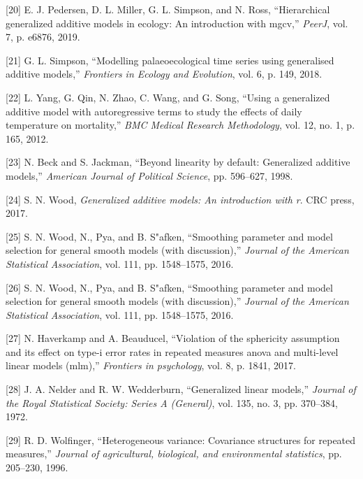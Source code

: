 \documentclass[
]{article}
\begin{document}
\leavevmode\hypertarget{ref-pedersen2019}{}%
{[}20{]} E. J. Pedersen, D. L. Miller, G. L. Simpson, and N. Ross, ``Hierarchical generalized additive models in ecology: An introduction with mgcv,'' \emph{PeerJ}, vol. 7, p. e6876, 2019.

\leavevmode\hypertarget{ref-simpson2018}{}%
{[}21{]} G. L. Simpson, ``Modelling palaeoecological time series using generalised additive models,'' \emph{Frontiers in Ecology and Evolution}, vol. 6, p. 149, 2018.

\leavevmode\hypertarget{ref-yang2012}{}%
{[}22{]} L. Yang, G. Qin, N. Zhao, C. Wang, and G. Song, ``Using a generalized additive model with autoregressive terms to study the effects of daily temperature on mortality,'' \emph{BMC Medical Research Methodology}, vol. 12, no. 1, p. 165, 2012.

\leavevmode\hypertarget{ref-beck1998}{}%
{[}23{]} N. Beck and S. Jackman, ``Beyond linearity by default: Generalized additive models,'' \emph{American Journal of Political Science}, pp. 596--627, 1998.

\leavevmode\hypertarget{ref-wood2017}{}%
{[}24{]} S. N. Wood, \emph{Generalized additive models: An introduction with r}. CRC press, 2017.

\leavevmode\hypertarget{ref-wood2011}{}%
{[}25{]} S. N. Wood, N., Pya, and B. S"afken, ``Smoothing parameter and model selection for general smooth models (with discussion),'' \emph{Journal of the American Statistical Association}, vol. 111, pp. 1548--1575, 2016.

\leavevmode\hypertarget{ref-wood2016}{}%
{[}26{]} S. N. Wood, N., Pya, and B. S"afken, ``Smoothing parameter and model selection for general smooth models (with discussion),'' \emph{Journal of the American Statistical Association}, vol. 111, pp. 1548--1575, 2016.

\leavevmode\hypertarget{ref-haverkamp2017}{}%
{[}27{]} N. Haverkamp and A. Beauducel, ``Violation of the sphericity assumption and its effect on type-i error rates in repeated measures anova and multi-level linear models (mlm),'' \emph{Frontiers in psychology}, vol. 8, p. 1841, 2017.

\leavevmode\hypertarget{ref-nelder1972}{}%
{[}28{]} J. A. Nelder and R. W. Wedderburn, ``Generalized linear models,'' \emph{Journal of the Royal Statistical Society: Series A (General)}, vol. 135, no. 3, pp. 370--384, 1972.

\leavevmode\hypertarget{ref-wolfinger1996}{}%
{[}29{]} R. D. Wolfinger, ``Heterogeneous variance: Covariance structures for repeated measures,'' \emph{Journal of agricultural, biological, and environmental statistics}, pp. 205--230, 1996.
\end{document}
